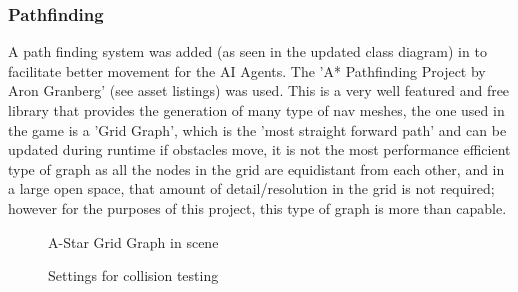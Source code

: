 \documentclass[11pt]{report}
\begin{document}
\subsubsection{Pathfinding}
A path finding system was added (as seen in the updated class diagram) in to facilitate better movement for the AI Agents. The 'A* Pathfinding Project by Aron Granberg' (see asset listings) was used. This is a very well featured and free library that provides the generation of many type of nav meshes, the one used in the game is a 'Grid Graph', which is the 'most straight forward path' and can be updated during runtime if obstacles move, it is not the most performance efficient type of graph as all the nodes in the grid are equidistant from each other, and in a large open space, that amount of detail/resolution in the grid is not required; however for the purposes of this project, this type of graph is more than capable. 
\cite{astarPathfinding}
\begin{figure}[H]
    \begin{minipage}{.5\textwidth}
        \centering
        \caption{A-Star Grid Graph in scene}
    \end{minipage}
    \begin{minipage}{.5\textwidth}
        \centering
        \caption{Settings for collision testing}
    \end{minipage}
\end{figure}
\end{document}
